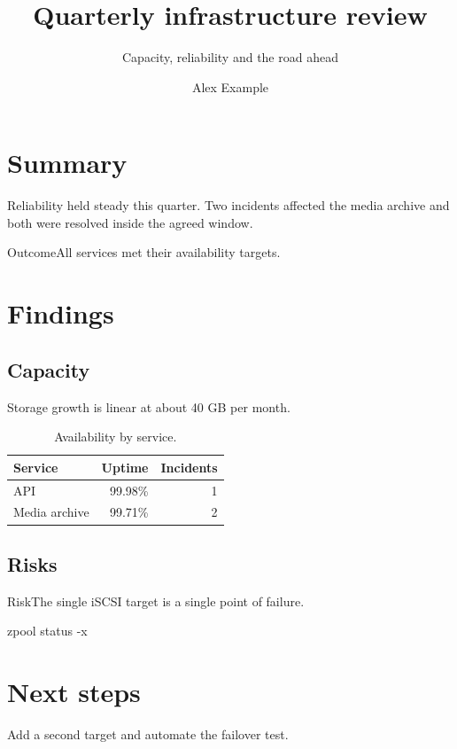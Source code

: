 \documentclass{jupiter-report}
\title{Quarterly infrastructure review}
\subtitle{Capacity, reliability and the road ahead}
\author{Alex Example}
\begin{document}
\maketitle
\tableofcontents
\clearpage
\section{Summary}
Reliability held steady this quarter. Two incidents affected the media archive and both were resolved inside the agreed window.
\begin{jpcallout}[ok]{Outcome}All services met their availability targets.\end{jpcallout}
\section{Findings}
\subsection{Capacity}
Storage growth is linear at about 40 GB per month.
\begin{table}[h]\centering
\begin{tabular}{@{}lrr@{}}\toprule
Service & Uptime & Incidents\\\midrule
API & 99.98\% & 1\\
Media archive & 99.71\% & 2\\\bottomrule
\end{tabular}
\caption{Availability by service.}
\end{table}
\subsection{Risks}
\begin{jpcallout}[warn]{Risk}The single iSCSI target is a single point of failure.\end{jpcallout}
\begin{jpcode}
zpool status -x
\end{jpcode}
\section{Next steps}
Add a second target and automate the failover test.
\end{document}
